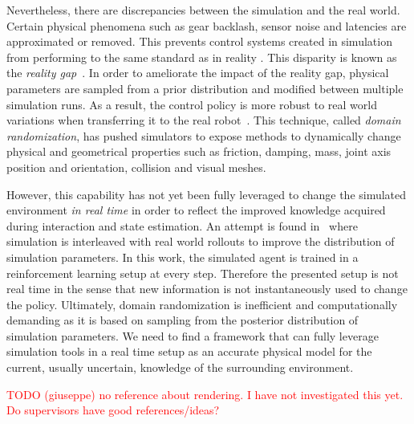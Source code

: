 Nevertheless, there are discrepancies between the simulation and the real world. Certain physical phenomena such as gear backlash, sensor noise and latencies are approximated or removed. This prevents control systems created in simulation from performing to the same standard as in reality \cite{collins_benchmarking_2020}. This disparity is known as the \emph{reality gap}~\cite{hofer2021sim2real}. In order to ameliorate the impact of the reality gap, physical parameters are sampled from a prior distribution and modified between multiple simulation runs. As a result, the control policy is more robust to real world variations when transferring it to the real robot~\cite{andrychowicz2020learning}. This technique, called \emph{domain randomization}, has pushed simulators to expose methods to dynamically change physical and geometrical properties such as friction, damping, mass, joint axis position and orientation, collision and visual meshes.

However, this capability has not yet been fully leveraged to change the simulated environment \emph{in real time} in order to reflect the improved knowledge acquired during interaction and state estimation. An attempt is found in~\cite{chebotar2019closing} where simulation is interleaved with real world rollouts to improve the distribution of simulation parameters. In this work, the simulated agent is trained in a reinforcement learning setup at every step. Therefore the presented setup is not real time in the sense that new information is not instantaneously used to change the policy. Ultimately, domain randomization is inefficient and computationally demanding as it is based on sampling from the posterior distribution of simulation parameters. We need to find a framework that can fully leverage simulation tools in a real time setup as an accurate physical model for the current, usually uncertain, knowledge of the surrounding environment.

\textcolor{red}{TODO (giuseppe) no reference about rendering. I have not investigated this yet. Do supervisors have good references/ideas?}